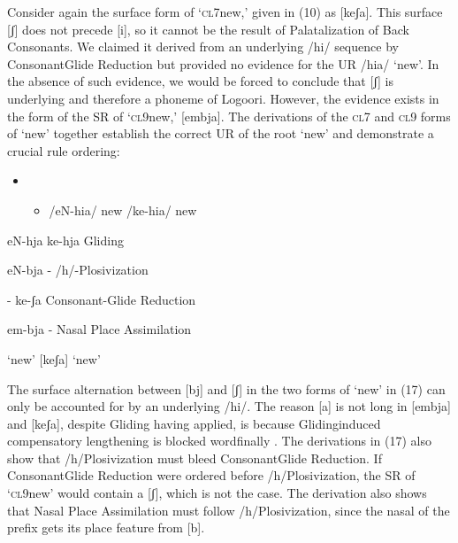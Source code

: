 \documentclass[output=paper]{langsci/langscibook}
\begin{document}
Consider again the surface form of ‘\textsc{cl}7new,’ given in (10) as [keʃa]. This surface [ʃ] does not precede [i], so it cannot be the result of Palatalization of Back Consonants. We claimed it derived from an underlying /hi/ sequence by ConsonantGlide Reduction but provided no evidence for the UR /hia/ ‘new’. In the absence of such evidence, we would be forced to conclude that [ʃ] is underlying and therefore a phoneme of Logoori. However, the evidence exists in the form of the SR of ‘\textsc{cl}9new,’ [embja]. The derivations of the \textsc{cl}7 and \textsc{cl}9 forms of ‘new’ together establish the correct UR of the root ‘new’ and demonstrate a crucial rule ordering:

\begin{itemize}
\item \setcounter{itemize}{0}
\begin{itemize}
\item \begin{styleListParagraph}
/eN-hia/  new  /ke-hia/  new
\end{styleListParagraph}
\end{itemize}
\end{itemize}
\begin{styleListParagraph}
eN-hja      ke-hja        Gliding
\end{styleListParagraph}

\begin{styleListParagraph}
eN-bja      {}-        /h/-Plosivization
\end{styleListParagraph}

\begin{styleListParagraph}
{}-        ke-ʃa        Consonant-Glide Reduction
\end{styleListParagraph}

\begin{styleListParagraph}
em-bja      {}-        Nasal Place Assimilation
\end{styleListParagraph}

\begin{styleListParagraph}
[embja]  ‘new’    [keʃa]     ‘new’
\end{styleListParagraph}

The surface alternation between [bj] and [ʃ] in the two forms of ‘new’ in (17) can only be accounted for by an underlying /hi/. The reason [a] is not long in [embja] and [keʃa], despite Gliding having applied, is because Glidinginduced compensatory lengthening is blocked wordfinally \citep{Leung1991}. The derivations in (17) also show that /h/Plosivization must bleed ConsonantGlide Reduction. If ConsonantGlide Reduction were ordered before /h/Plosivization, the SR of ‘\textsc{cl}9new’ would contain a [ʃ], which is not the case. The derivation also shows that Nasal Place Assimilation must follow /h/Plosivization, since the nasal of the prefix gets its place feature from [b].
\end{document}
